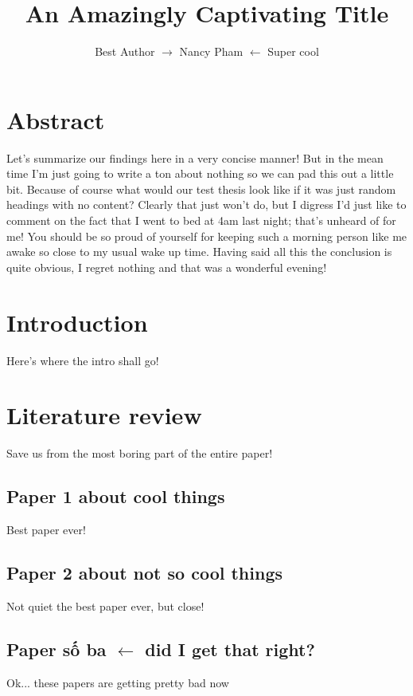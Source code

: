 \documentclass[]{article}
\begin{document}
\title{An Amazingly Captivating Title}
\author {Best Author $\rightarrow$ Nancy Pham  $\leftarrow$  Super cool}

\maketitle

\newpage
\tableofcontents
\newpage

\section{Abstract}
Let's summarize our findings here in a very concise manner! But in the mean time I'm just going to write a ton about nothing so we can pad this out a little bit. Because of course what would our test thesis look like if it was just random headings with no content? Clearly that just won't do, but I digress I'd just like to comment on the fact that I went to bed at 4am last night; that's unheard of for me! You should be so proud of yourself for keeping such a morning person like me awake so close to my usual wake up time. Having said all this the conclusion is quite obvious, I regret nothing and that was a wonderful evening!

\section{Introduction}
Here's where the intro shall go!

\section{Literature review}
Save us from the most boring part of the entire paper!
\subsection{Paper 1 about cool things}
Best paper ever!
\subsection{Paper 2 about not so cool things}
Not quiet the best paper ever, but close!
\subsection{Paper số ba $\leftarrow$ did I get that right? }
Ok... these papers are getting pretty bad now
\end{document}
